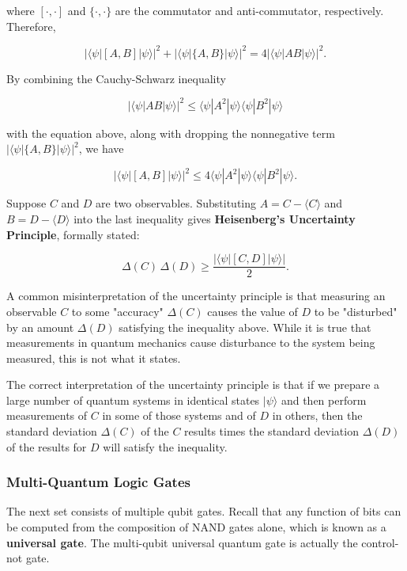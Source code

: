 \documentclass{article}
\theoremstyle{definition}
\begin{document}
      where $[\cdot, \cdot]$ and $\{ \cdot, \cdot \}$ are the commutator and anti-commutator, respectively. Therefore,

        \[| \langle \psi | [A, B] | \psi\rangle|^2 + | \langle \psi | \{A, B\}| \psi \rangle|^2 = 4|\langle \psi | AB | \psi \rangle |^2.\]

      By combining the Cauchy-Schwarz inequality

        \[|\langle \psi | AB | \psi \rangle|^2 \leq \langle \psi | A^2 | \psi \rangle \langle \psi | B^2 | \psi \rangle\]

      with the equation above, along with dropping the nonnegative term $| \langle \psi | \{A, B\}| \psi \rangle|^2$, we have

        \[|\langle \psi| [A, B] | \psi \rangle |^2 \leq 4 \langle \psi | A^2 | \psi \rangle \langle \psi | B^2 | \psi \rangle.\]

      Suppose $C$ and $D$ are two observables. Substituting $A = C - \langle C \rangle$ and $B = D - \langle D \rangle$ into the last inequality gives \textbf{Heisenberg's Uncertainty Principle}, formally stated:

        \[\Delta (C) \, \Delta (D) \geq \frac{|\langle \psi |[C, D] | \psi \rangle|}{2}.\]

      A common misinterpretation of the uncertainty principle is that measuring an observable $C$ to some "accuracy" $\Delta (C)$ causes the value of $D$ to be "disturbed" by an amount $\Delta (D)$ satisfying the inequality above. While it is true that measurements in quantum mechanics cause disturbance to the system being measured, this is not what it states.

      The correct interpretation of the uncertainty principle is that if we prepare a large number of quantum systems in identical states $|\psi \rangle$ and then perform measurements of $C$ in some of those systems and of $D$ in others, then the standard deviation $\Delta (C)$ of the $C$ results times the standard deviation $\Delta(D)$ of the results for $D$ will satisfy the inequality.

    \subsubsection{Multi-Quantum Logic Gates}

      The next set consists of multiple qubit gates. Recall that any function of bits can be computed from the composition of NAND gates alone, which is known as a \textbf{universal gate}. The multi-qubit universal quantum gate is actually the control-not gate.
\end{document}

